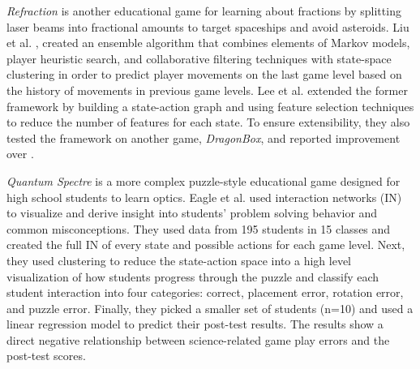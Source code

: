\documentclass{sigchi}
\begin{document}

\textit {Refraction} \cite{andersen2010gameplay} is another educational game for learning about fractions by splitting laser beams into fractional amounts to target spaceships and avoid asteroids. 
Liu et al. \cite{liu2013predicting}, created an ensemble algorithm that combines elements of Markov models, player heuristic search, and collaborative filtering techniques with state-space clustering in order to predict player movements on the last game level based on the history of movements in previous game levels. 
Lee et al. \cite{lee2014learning} extended the former framework by building a state-action graph and using feature selection techniques to reduce the number of features for each state. 
To ensure extensibility, they also tested the framework on another game, \textit {DragonBox}, and reported improvement over \cite{liu2013predicting}.

\textit {Quantum Spectre} is a more complex puzzle-style educational game designed for high school students to learn optics. 
Eagle et al. \cite{eagle2015measuring} used interaction networks (IN) to visualize and derive insight into students' problem solving behavior and common misconceptions. 
They used data from 195 students in 15 classes and created the full IN of every state and possible actions for each game level. 
Next, they used clustering to reduce the state-action space into a high level visualization of how students progress through the puzzle and classify each student interaction into four categories: correct, placement error, rotation error, and puzzle error. 
Finally, they picked a smaller set of students (n=10) and used a linear regression model to predict their post-test results.
The results show a direct negative relationship between science-related game play errors and the post-test scores.
\end{document}

